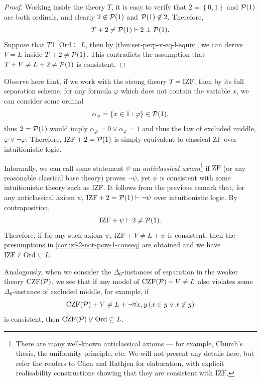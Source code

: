 \documentclass[12pt,openany]{book}
\makeatletter
\newcommand\indg[1]{\index{A@General!#1}}
\theoremstyle{plain}
\theoremstyle{definition}
\newcommand\opA[1]{\mathop{\forall #1}}
\newcommand\Pow{\mathcal{P}}
\newcommand\CZFP{\mathrm{CZF}\mleft(\Pow\mright)}
\newcommand\IZF{\mathrm{IZF}}
\newcommand\ZF{\mathrm{ZF}}
\newcommand\Ord{\mathrm{Ord}}
\makeatother
\begin{document}
\begin{proof}
  Working inside the theory $T$, it is easy to verify that $2 = \left\{0, 1\right\}$ and $\Pow\mleft(1\mright)$ are both ordinals, and clearly $2 \not\in \Pow\mleft(1\mright)$ and $\Pow\mleft(1\mright) \not\in 2$. Therefore,
  \[T + 2 \neq \Pow\mleft(1\mright) \vdash 2 \perp \Pow\mleft(1\mright).\]
  Suppose that $T \vdash \Ord \subseteq L$, then by \autoref{thm:set-perp-v-eq-l-equiv}, we can derive $V = L$ inside $T + 2 \neq \Pow\mleft(1\mright)$. This contradicts the assumption that $T + V \neq L + 2 \neq \Pow\mleft(1\mright)$ is consistent.
\end{proof}

Observe here that, if we work with the strong theory $T = \IZF$, then by its full separation scheme, for any formula $\varphi$ which does not contain the variable $x$, we can consider some ordinal
\[\alpha_\varphi = \left\{x \in 1 : \varphi\right\} \in \Pow\mleft(1\mright),\]
thus $2 = \Pow\mleft(1\mright)$ would imply $\alpha_\varphi = 0 \lor \alpha_\varphi = 1$ and thus the law of excluded middle, $\varphi \lor \neg \varphi$. Therefore, $\IZF + 2 = \Pow\mleft(1\mright)$ is simply equivalent to classical $\ZF$ over intuitionistic logic.

Informally, we can call some statement $\psi$ an \emph{anticlassical axiom}\indg{anticlassical axiom}\footnote{There are many well-known anticlassical axioms --- for example, Church's thesis, the uniformity principle, etc. We will not present any details here, but refer the readers to Chen and Rathjen \cite{chen-rm-rathjen12-lifschitz-realizability} for elaboration, with explicit realisability constructions showing that they are consistent with $\IZF$.} if $\ZF$ (or any reasonable classical base theory) proves $\neg \psi$, yet $\psi$ is consistent with some intuitionistic theory such as $\IZF$. It follows from the previous remark that, for any anticlassical axiom $\psi$, $\IZF + 2 = \Pow\mleft(1\mright) \vdash \neg \psi$ over intuitionistic logic. By contraposition,
\[\IZF + \psi \vdash 2 \neq \Pow\mleft(1\mright).\]
Therefore, if for any such axiom $\psi$, $\IZF + V \neq L + \psi$ is consistent, then the presumptions in \autoref{cor:izf-2-not-pow-1-conseq} are obtained and we have $\IZF \not\vdash \Ord \subseteq L$.

Analogously, when we consider the $\Delta_0$-instances of separation in the weaker theory $\CZFP$, we see that if any model of $\CZFP + V \neq L$ also violates some $\Delta_0$-instance of excluded middle, for example, if
\[\CZFP + V \neq L + \neg\!\opA{x, y} \left(x \in y \lor x \not\in y\right)\]
is consistent, then $\CZFP \not\vdash \Ord \subseteq L$.
\end{document}
